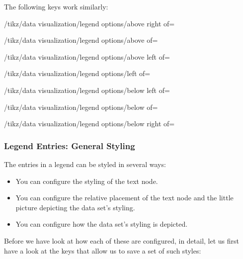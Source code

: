 The following keys work similarly:
%
\begin{key}{/tikz/data visualization/legend options/above right of=}
\end{key}
%
\begin{key}{/tikz/data visualization/legend options/above of=}
\end{key}
%
\begin{key}{/tikz/data visualization/legend options/above left of=}
\end{key}
%
\begin{key}{/tikz/data visualization/legend options/left of=}
\end{key}
%
\begin{key}{/tikz/data visualization/legend options/below left of=}
\end{key}
%
\begin{key}{/tikz/data visualization/legend options/below of=}
\end{key}
%
\begin{key}{/tikz/data visualization/legend options/below right of=}
\end{key}


\subsubsection{Legend Entries: General Styling}
\label{section-dv-label-legend-entry-options}

The entries in a legend can be styled in several ways:
%
\begin{itemize}
    \item You can configure the styling of the text node.
    \item You can configure the relative placement of the text node and the
        little picture depicting the data set's styling.
    \item You can configure how the data set's styling is depicted.
\end{itemize}

Before we have look at how each of these are configured, in detail, let us
first have a look at the keys that allow us to save a set of such styles:


